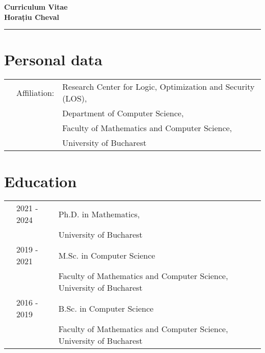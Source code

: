 \documentclass[letterpaper,11pt,oneside]{article}
\begin{document}

\noindent  \huge{\textbf{Curriculum Vitae \\ Horațiu Cheval}}  \\
\vspace{-2ex}
\hrule
\normalsize




\vspace{1em}



\noindent
\section{Personal data}
\normalsize 
\begin{tabular}{@{} l l l}
    &Affiliation:& Research Center for Logic, Optimization and Security (LOS), \\ 
    && Department of Computer Science, \\ 
    && Faculty of Mathematics and Computer Science, \\ 
    && University of Bucharest 
\end{tabular}


\noindent
\section{Education} 
\normalsize
\begin{tabular}{@{} l l l}
    & 2021 - 2024 & Ph.D. in Mathematics, \\ 
    &                & University of Bucharest \\
    & 2019 - 2021 & M.Sc. in Computer Science \\  
    &                & Faculty of Mathematics and Computer Science, University of Bucharest \\
    & 2016 - 2019    & B.Sc. in Computer Science \\
    &                & Faculty of Mathematics and Computer Science, University of Bucharest \\

\end{tabular}
\end{document}

